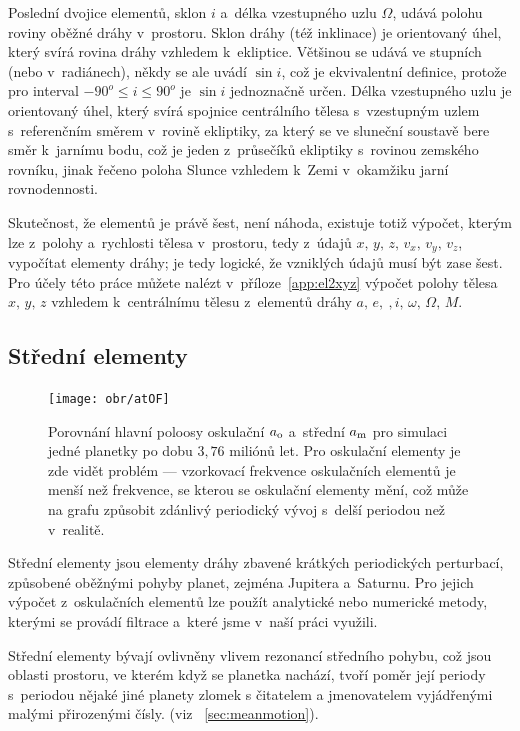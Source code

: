 \documentclass[A4paper, 12pt, oneside]{book}
\begin{document}
Poslední dvojice elementů, sklon $i$ a~délka vzestupného uzlu $\Omega$, udává polohu roviny oběžné dráhy v~prostoru. Sklon dráhy (též inklinace) je orientovaný úhel, který svírá rovina dráhy vzhledem k~ekliptice. Většinou se udává ve stupních (nebo v~radiánech), někdy se ale uvádí $\sin i$, což je ekvivalentní definice, protože pro interval $-90^o\leq i \leq 90^o$ je $\sin i$ jednoznačně určen. Délka vzestupného uzlu je orientovaný úhel, který svírá spojnice centrálního tělesa s~vzestupným uzlem s~referenčním směrem v~rovině ekliptiky, za který se ve sluneční soustavě bere směr k~jarnímu bodu, což je jeden z~průsečíků ekliptiky s~rovinou zemského rovníku, jinak řečeno poloha Slunce vzhledem k~Zemi v~okamžiku jarní rovnodennosti.

Skutečnost, že elementů je právě šest, není náhoda, existuje totiž výpočet, kterým lze z~polohy a~rychlosti tělesa v~prostoru, tedy z~údajů $x,\, y,\, z,\, v_x,\, v_y,\, v_z$, vypočítat elementy dráhy; je tedy logické, že vzniklých údajů musí být zase šest. Pro účely této práce můžete nalézt v~příloze~\ref{app:el2xyz} výpočet polohy tělesa $x,\,y,\,z$ vzhledem k~centrálnímu tělesu z~elementů dráhy $a,\,e,~,i,\,\omega,\,\Omega,\,M$.

\subsection{Střední elementy}

\begin{figure}
	\centering
	\texttt{[image: obr/atOF]}
	\caption{Porovnání hlavní poloosy oskulační $a_{\rm o}$ a~střední $a_{\rm m}$ pro simulaci jedné planetky po dobu $3,76$ miliónů let. Pro oskulační elementy je zde vidět problém  --- vzorkovací frekvence oskulačních elementů je menší než frekvence, se kterou se oskulační elementy mění, což může na grafu způsobit zdánlivý periodický vývoj s~delší periodou než v~realitě.} 
	\label{atOF}
\end{figure}

Střední elementy jsou elementy dráhy zbavené krátkých periodických perturbací, způsobené oběžnými pohyby planet, zejména Jupitera a~Saturnu. Pro jejich výpočet z~oskulačních elementů lze použít analytické nebo numerické metody, kterými se provádí filtrace a~které jsme v~naší práci využili. 

Střední elementy bývají ovlivněny vlivem rezonancí středního pohybu, což jsou oblasti prostoru, ve kterém když se planetka nachází, tvoří poměr její periody s~periodou nějaké jiné planety zlomek s čitatelem a jmenovatelem vyjádřenými malými přirozenými čísly. (viz ~\ref{sec:meanmotion}). 
\end{document}
